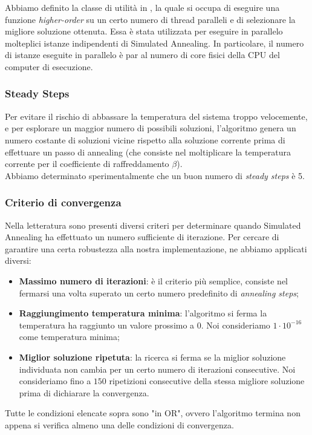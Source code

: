 \noindent Abbiamo definito la classe di utilità  in , la quale si occupa di eseguire una funzione \textit{higher-order} su un certo numero di thread paralleli e di selezionare la migliore soluzione ottenuta. Essa è stata utilizzata per eseguire in parallelo molteplici istanze indipendenti di Simulated Annealing. In particolare, il numero di istanze eseguite in parallelo è par al numero di core fisici della CPU del computer di esecuzione.

\subsubsection{Steady Steps}

\noindent Per evitare il rischio di abbassare la temperatura del sistema troppo velocemente, e per esplorare un maggior numero di possibili soluzioni, l'algoritmo genera un numero costante di soluzioni vicine rispetto alla soluzione corrente prima di effettuare un passo di annealing (che consiste nel moltiplicare la temperatura corrente per il coefficiente di raffreddamento $\beta$). \\

\noindent Abbiamo determinato sperimentalmente che un buon numero di \textit{steady steps} è 5.

\subsubsection{Criterio di convergenza}

\noindent Nella letteratura sono presenti diversi criteri per determinare quando Simulated Annealing ha effettuato un numero sufficiente di iterazione. Per cercare di garantire una certa robustezza alla nostra implementazione, ne abbiamo applicati diversi:

\begin{itemize}
    \item \textbf{Massimo numero di iterazioni}: è il criterio più semplice, consiste nel fermarsi una volta superato un certo numero predefinito di \textit{annealing steps};
    \item \textbf{Raggiungimento temperatura minima}: l'algoritmo si ferma la temperatura ha raggiunto un valore prossimo a 0. Noi consideriamo $1 \cdot 10^{-16}$ come temperatura minima;
    \item \textbf{Miglior soluzione ripetuta}: la ricerca si ferma se la miglior soluzione individuata non cambia per un certo numero di iterazioni consecutive. Noi consideriamo fino a $150$ ripetizioni consecutive della stessa migliore soluzione prima di dichiarare la convergenza.
\end{itemize}

\noindent Tutte le condizioni elencate sopra sono "in OR", ovvero l'algoritmo termina non appena si verifica almeno una delle condizioni di convergenza.

